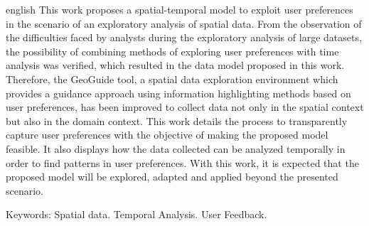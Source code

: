 






\begin{resumo}[Abstract]
	\begin{otherlanguage*}{english}
		This work proposes a spatial-temporal model to exploit user preferences in the scenario of an exploratory analysis of spatial data. From the observation of the difficulties faced by analysts during the exploratory analysis of large datasets, the possibility of combining methods of exploring user preferences with time analysis was verified, which resulted in the data model proposed in this work. Therefore, the GeoGuide tool, a spatial data exploration environment which provides a guidance approach using information highlighting methods based on user preferences, has been improved to collect data not only in the spatial context but also in the domain context. This work details the process to transparently capture user preferences with the objective of making the proposed model feasible. It also displays how the data collected can be analyzed temporally in order to find patterns in user preferences. With this work, it is expected that the proposed model will be explored, adapted and applied beyond the presented scenario.
   
   
	  \noindent
	  {Keywords}: Spatial data. Temporal Analysis. User Feedback.
	\end{otherlanguage*}
   \end{resumo}